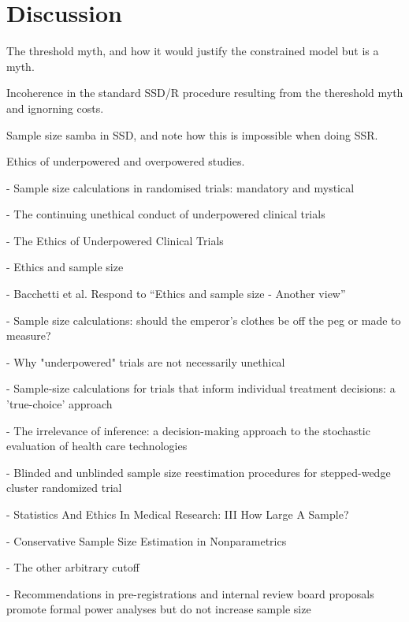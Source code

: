 \documentclass[sagev, Crown]{sagej}
\begin{document}
\section{Discussion}\label{sec:discussion}

The threshold myth, and how it would justify the constrained model but is a myth.

Incoherence in the standard SSD/R procedure resulting from the thereshold myth and ignorning costs.

Sample size samba in SSD, and note how this is impossible when doing SSR.

Ethics of underpowered and overpowered studies.

\cite{Schulz2005} - Sample size calculations in randomised trials: mandatory and mystical

\cite{Halpern2002} - The continuing unethical conduct of underpowered clinical trials

\cite{Lilford2002} - The Ethics of Underpowered Clinical Trials

\cite{Bacchetti2005a} - Ethics and sample size

\cite{Bacchetti2005} - Bacchetti et al. Respond to ``Ethics and sample size - Another view''

\cite{Norman2012} - Sample size calculations: should the emperor's clothes be off the peg or made to measure?

\cite{Edwards1997} - Why "underpowered" trials are not necessarily unethical

\cite{Girling2007} - Sample-size calculations for trials that inform individual treatment decisions: a 'true-choice' approach

\cite{Claxton1999} - The irrelevance of inference: a decision-making approach to the stochastic evaluation of health care technologies

\cite{Grayling2018} - Blinded and unblinded sample size reestimation procedures for stepped-wedge cluster randomized trial

\cite{Altman1980} - Statistics And Ethics In Medical Research: III How Large A Sample?

\cite{DeMartini2010} - Conservative Sample Size Estimation in Nonparametrics

\cite{Bacchetti2019} - The other arbitrary cutoff

\cite{Bakker2020} - Recommendations in pre-registrations and internal review board proposals promote formal power analyses but do not increase sample size
\end{document}
